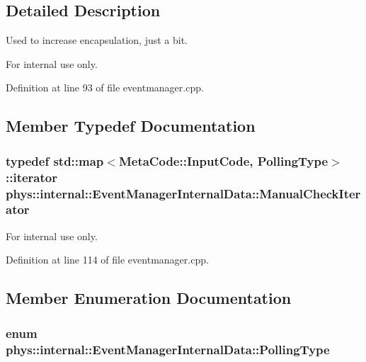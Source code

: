 \subsection{Detailed Description}
Used to increase encapsulation, just a bit. \begin{DoxyInternal}{For internal use only.}
\end{DoxyInternal}


Definition at line 93 of file eventmanager.cpp.



\subsection{Member Typedef Documentation}
\hypertarget{structphys_1_1internal_1_1EventManagerInternalData_ad2b9c7924f32e299846f1d945cb82dc0}{
\subsubsection[{ManualCheckIterator}]{\setlength{\rightskip}{0pt plus 5cm}typedef std::map$<${\bf MetaCode::InputCode}, {\bf PollingType}$>$::iterator {\bf phys::internal::EventManagerInternalData::ManualCheckIterator}}}
\label{d6/d3a/structphys_1_1internal_1_1EventManagerInternalData_ad2b9c7924f32e299846f1d945cb82dc0}
\begin{DoxyInternal}{For internal use only.}
\end{DoxyInternal}


Definition at line 114 of file eventmanager.cpp.



\subsection{Member Enumeration Documentation}
\hypertarget{structphys_1_1internal_1_1EventManagerInternalData_ab9ab8380b84448aacf46a63050e159af}{
\subsubsection[{PollingType}]{\setlength{\rightskip}{0pt plus 5cm}enum {\bf phys::internal::EventManagerInternalData::PollingType}}}
\label{d6/d3a/structphys_1_1internal_1_1EventManagerInternalData_ab9ab8380b84448aacf46a63050e159af}


